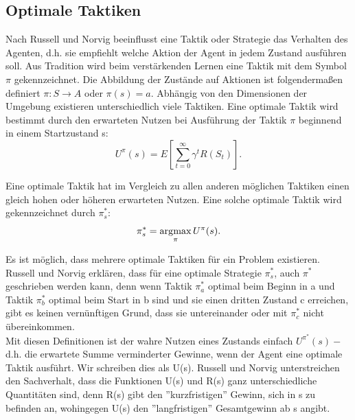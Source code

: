 \subsection{Optimale Taktiken}
\label{subsec:Optimale Taktiken}
Nach Russell und Norvig \cite[757\psq]{Russell} beeinflusst eine Taktik oder Strategie das Verhalten des Agenten, d.h. sie empfiehlt welche Aktion der Agent in jedem Zustand ausführen soll. Aus Tradition wird beim verstärkenden Lernen eine Taktik mit dem Symbol $\pi$ gekennzeichnet. Die Abbildung der Zustände auf Aktionen ist folgendermaßen definiert $\pi : S \rightarrow A$ oder $\pi(s) = a$. Abhängig von den Dimensionen der Umgebung existieren unterschiedlich viele Taktiken. Eine optimale Taktik wird bestimmt durch den erwarteten Nutzen bei Ausführung der Taktik $\pi$ beginnend in einem Startzustand s:\\

\begin{equation}
\label{eq:Der erwartete Nutzen}
U^\pi(s) = E\left[\sum_{t=0}^{\infty} \gamma^t R(S_t)\right].
\end{equation}

Eine optimale Taktik hat im Vergleich zu allen anderen möglichen Taktiken einen gleich hohen oder höheren erwarteten Nutzen. Eine solche optimale Taktik wird gekennzeichnet durch $\pi^*_s$: \\ 

\begin{equation}
\pi^*_s = \operatorname*{arg\!\max}_\pi U^\pi(s).
\end{equation}

Es ist möglich, dass mehrere optimale Taktiken für ein Problem existieren. Russell und Norvig erklären, dass für eine optimale Strategie $\pi^*_s$, auch $\pi^*$ geschrieben werden kann, denn wenn Taktik $\pi^*_a$ optimal beim Beginn in a und Taktik $\pi^*_b$ optimal beim Start in b sind und sie einen dritten Zustand c erreichen, gibt es keinen vernünftigen Grund, dass sie untereinander oder mit $\pi^*_c$ nicht übereinkommen. \\

Mit diesen Definitionen ist der wahre Nutzen eines Zustands einfach $U^{\pi^*}(s) -$ d.h. die erwartete Summe verminderter Gewinne, wenn der Agent eine optimale Taktik ausführt. Wir schreiben dies als U(s). Russell und Norvig unterstreichen den Sachverhalt, dass die Funktionen U(s) und R(s) ganz unterschiedliche Quantitäten sind, denn R(s) gibt den ''kurzfristigen'' Gewinn, sich in s zu befinden an, wohingegen U(s) den ''langfristigen'' Gesamtgewinn ab s angibt.

